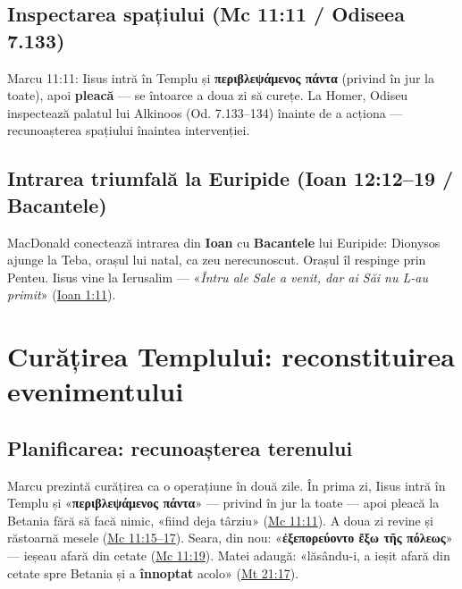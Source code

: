 \documentclass[12pt,a4paper,twoside,openany]{book}
\begin{document}
\subsection{Inspectarea spațiului (Mc 11:11 / Odiseea 7.133)}

Marcu 11:11: Iisus intră în Templu și \textbf{περιβλεψάμενος πάντα} (privind în jur la toate), apoi \textbf{pleacă} — se întoarce a doua zi să curețe. La Homer, Odiseu inspectează palatul lui Alkinoos (Od. 7.133--134) înainte de a acționa — recunoașterea spațiului înaintea intervenției.

\subsection{Intrarea triumfală la Euripide (Ioan 12:12--19 / Bacantele)}

MacDonald conectează intrarea din \textbf{Ioan} cu \textbf{Bacantele} lui Euripide: Dionysos ajunge la Teba, orașul lui natal, ca zeu nerecunoscut. Orașul îl respinge prin Penteu. Iisus vine la Ierusalim — «\textit{Întru ale Sale a venit, dar ai Săi nu L-au primit}» (\href{https://bibliaortodoxa.ro/carte.php?id=35\&cap=1\#11}{Ioan 1:11}).

\section{Curățirea Templului: reconstituirea evenimentului}

\subsection{Planificarea: recunoașterea terenului}

Marcu prezintă curățirea ca o operațiune în două zile. În prima zi, Iisus intră în Templu și «\textbf{περιβλεψάμενος πάντα}» — privind în jur la toate — apoi pleacă la Betania fără să facă nimic, «fiind deja târziu» (\href{https://bibliaortodoxa.ro/carte.php?id=53\&cap=11\#11}{Mc 11:11}). A doua zi revine și răstoarnă mesele (\href{https://bibliaortodoxa.ro/carte.php?id=53\&cap=11\#15}{Mc 11:15--17}). Seara, din nou: «\textbf{ἐξεπορεύοντο ἔξω τῆς πόλεως}» — ieșeau afară din cetate (\href{https://bibliaortodoxa.ro/carte.php?id=53\&cap=11\#19}{Mc 11:19}). Matei adaugă: «lăsându-i, a ieșit afară din cetate spre Betania și a \textbf{înnoptat} acolo» (\href{https://bibliaortodoxa.ro/carte.php?id=55\&cap=21\#17}{Mt 21:17}).
\end{document}
